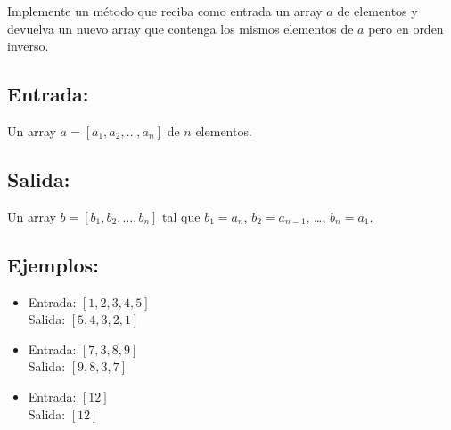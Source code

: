 Implemente un método que reciba como entrada un array \(a\) de elementos y devuelva un nuevo array que contenga los mismos elementos de \(a\) pero en orden inverso.

\subsection*{Entrada:}

Un array \(a = [a_1, a_2, \dots, a_n]\) de \(n\) elementos.

\subsection*{Salida:}

Un array \(b = [b_1, b_2, \dots, b_n]\) tal que \(b_1 = a_n\), \(b_2 = a_{n-1}\), \dots, \(b_n = a_1\).

\subsection*{Ejemplos:}
\begin{itemize}
    \item Entrada: \([1, 2, 3, 4, 5]\) \\
    Salida: \([5, 4, 3, 2, 1]\)
    \item Entrada: \([7, 3, 8, 9]\) \\
    Salida: \([9, 8, 3, 7]\)
    \item Entrada: \([12]\) \\
    Salida: \([12]\)
\end{itemize}
